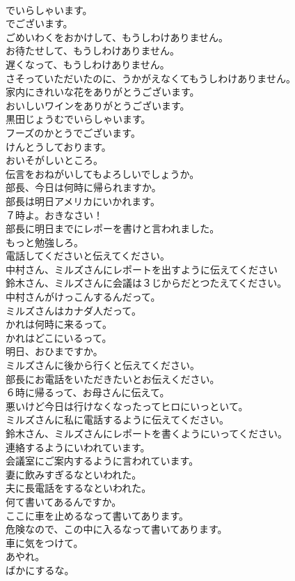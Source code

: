 \documentclass[8pt]{extreport}
\begin{document}
\begin{CJK}{UTF8}{min}
\\	でいらしゃいます。
\\	でございます。
\\	ごめいわくをおかけして、もうしわけありません。
\\	お待たせして、もうしわけありません。
\\	遅くなって、もうしわけありません。
\\	さそっていただいたのに、うかがえなくてもうしわけありません。
\\	家内にきれいな花をありがとうございます。
\\	おいしいワインをありがとうございます。
\\	黒田じょうむでいらしゃいます。
\\	フーズのかとうでございます。
\\	けんとうしております。
\\	おいそがしいところ。
\\	伝言をおねがいしてもよろしいでしょうか。
\\	部長、今日は何時に帰られますか。
\\	部長は明日アメリカにいかれます。
\\	７時よ。おきなさい！
\\	部長に明日までにレポーを書けと言われました。
\\	もっと勉強しろ。
\\	電話してくださいと伝えてください。
\\	中村さん、ミルズさんにレポートを出すように伝えてください
\\	鈴木さん、ミルズさんに会議は３じからだとつたえてください。
\\	中村さんがけっこんするんだって。
\\	ミルズさんはカナダ人だって。
\\	かれは何時に来るって。
\\	かれはどこにいるって。
\\	明日、おひまですか。
\\	ミルズさんに後から行くと伝えてください。
\\	部長にお電話をいただきたいとお伝えください。
\\	６時に帰るって、お母さんに伝えて。
\\	悪いけど今日は行けなくなったってヒロにいっといて。
\\	ミルズさんに私に電話するように伝えてください。
\\	鈴木さん、ミルズさんにレポートを書くようにいってください。
\\	連絡するようにいわれています。
\\	会議室にご案内するように言われています。
\\	妻に飲みすぎるなといわれた。
\\	夫に長電話をするなといわれた。
\\	何て書いてあるんですか。
\\	ここに車を止めるなって書いてあります。
\\	危険なので、この中に入るなって書いてあります。
\\	車に気をつけて。
\\	あやれ。
\\	ばかにするな。
\end{CJK}
\end{document}

